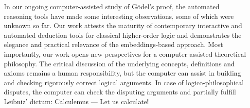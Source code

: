 \documentclass{easychair}
\begin{document}
In our ongoing computer-assisted study of G\"odel's proof, the
automated reasoning tools have made some interesting observations,
some of which were unknown so far. Our work attests the maturity of
contemporary interactive and automated deduction tools for classical
higher-order logic and demonstrates the elegance and practical
relevance of the embeddings-based approach.  Most importantly, our
work opens new perspectives for a computer-assisted theoretical
philosophy.  The critical discussion of the underlying concepts,
definitions and axioms remains a human responsibility, but the
computer can assist in building and checking rigorously correct
logical arguments. In case of logico-philosophical disputes, the
computer can check the disputing arguments and partially fulfill
Leibniz' dictum: Calculemus --- Let us calculate!
\end{document}
